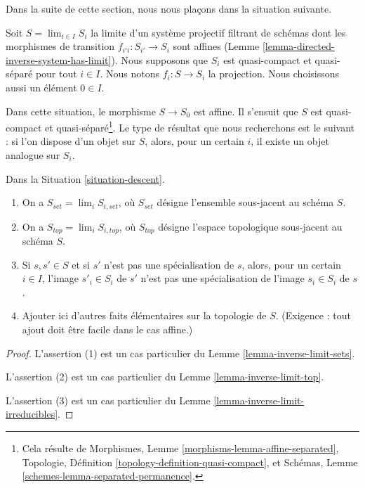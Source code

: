 \noindent
Dans la suite de cette section, nous nous plaçons dans la situation suivante.

\begin{situation}
\label{situation-descent}
Soit $S = \lim_{i \in I} S_i$ la limite d'un système projectif filtrant de schémas
dont les morphismes de transition $f_{i'i} : S_{i'} \to S_i$ sont affines
(Lemme \ref{lemma-directed-inverse-system-has-limit}). Nous supposons que
$S_i$ est quasi-compact et quasi-séparé pour tout $i \in I$. Nous notons
$f_i : S \to S_i$ la projection. Nous choisissons aussi un élément
$0 \in I$.
\end{situation}

\noindent
Dans cette situation, le morphisme $S \to S_0$ est affine. Il s'ensuit que
$S$ est quasi-compact et quasi-séparé\footnote{Cela résulte de Morphismes,
Lemme \ref{morphisms-lemma-affine-separated}, Topologie,
Définition \ref{topology-definition-quasi-compact}, et Schémas,
Lemme \ref{schemes-lemma-separated-permanence}.}. Le type de résultat que
nous recherchons est le suivant : si l'on dispose d'un objet sur $S$, alors,
pour un certain $i$, il existe un objet analogue sur $S_i$.

\begin{lemma}
\label{lemma-topology-limit}
Dans la Situation \ref{situation-descent}.
\begin{enumerate}
\item On a $S_{set} = \lim_i S_{i, set}$, où $S_{set}$ désigne l'ensemble
sous-jacent au schéma $S$.
\item On a $S_{top} = \lim_i S_{i, top}$, où $S_{top}$ désigne l'espace
topologique sous-jacent au schéma $S$.
\item Si $s, s' \in S$ et si $s'$ n'est pas une spécialisation de $s$,
alors, pour un certain $i \in I$, l'image $s'_i \in S_i$ de $s'$ n'est pas
une spécialisation de l'image $s_i \in S_i$ de $s$.
\item Ajouter ici d'autres faits élémentaires sur la topologie de $S$.
(Exigence : tout ajout doit être facile dans le cas affine.)
\end{enumerate}
\end{lemma}

\begin{proof}
L'assertion (1) est un cas particulier du Lemme \ref{lemma-inverse-limit-sets}.

\medskip\noindent
L'assertion (2) est un cas particulier du Lemme \ref{lemma-inverse-limit-top}.

\medskip\noindent
L'assertion (3) est un cas particulier du
Lemme \ref{lemma-inverse-limit-irreducibles}.
\end{proof}

